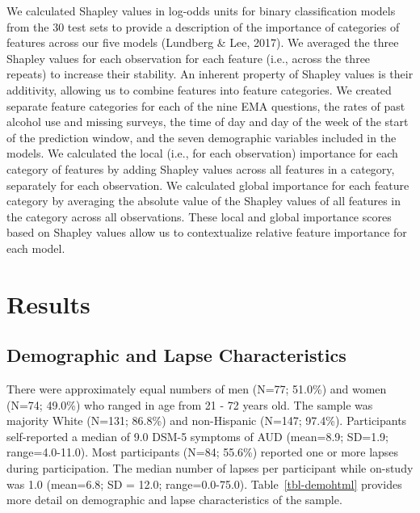 \documentclass[
]{agujournal2019}
\begin{document}
We calculated Shapley values in log-odds units for binary classification
models from the 30 test sets to provide a description of the importance
of categories of features across our five models (Lundberg \& Lee,
2017). We averaged the three Shapley values for each observation for
each feature (i.e., across the three repeats) to increase their
stability. An inherent property of Shapley values is their additivity,
allowing us to combine features into feature categories. We created
separate feature categories for each of the nine EMA questions, the
rates of past alcohol use and missing surveys, the time of day and day
of the week of the start of the prediction window, and the seven
demographic variables included in the models. We calculated the local
(i.e., for each observation) importance for each category of features by
adding Shapley values across all features in a category, separately for
each observation. We calculated global importance for each feature
category by averaging the absolute value of the Shapley values of all
features in the category across all observations. These local and global
importance scores based on Shapley values allow us to contextualize
relative feature importance for each model.

\section{Results}\label{results}

\subsection{Demographic and Lapse
Characteristics}\label{demographic-and-lapse-characteristics}

There were approximately equal numbers of men (N=77; 51.0\%) and women
(N=74; 49.0\%) who ranged in age from 21 - 72 years old. The sample was
majority White (N=131; 86.8\%) and non-Hispanic (N=147; 97.4\%).
Participants self-reported a median of 9.0 DSM-5 symptoms of AUD
(mean=8.9; SD=1.9; range=4.0-11.0). Most participants (N=84; 55.6\%)
reported one or more lapses during participation. The median number of
lapses per participant while on-study was 1.0 (mean=6.8; SD = 12.0;
range=0.0-75.0). Table~\ref{tbl-demohtml} provides more detail on
demographic and lapse characteristics of the sample.
\end{document}
